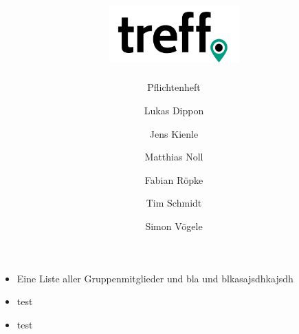 \documentclass[aspectratio=1610]{beamer}
\title{\includegraphics[width = 50mm]{images/logo_crop.png}}
\subtitle{\huge Pflichtenheft}
\author{Lukas Dippon
	\and Jens Kienle
	\and Matthias Noll
	\and Fabian Röpke
	\and Tim Schmidt
	\and Simon Vögele}
\begin{document}
	
	\begin{frame}[plain]
	\maketitle
	\end{frame}

	\begin{frame}[plain]
		\begin{minipage}{0.5\textwidth}
			\setlength{\fboxsep}{0pt}%
			\setlength{\fboxrule}{1pt}%
			\captionsetup{labelformat=empty}
			\centering
		\end{minipage}%
		\begin{minipage}{0.5\textwidth}
			\begin{itemize}
				\item Eine Liste aller Gruppenmitglieder und bla und blkasajsdhkajsdh
				\item test
				\item test
			\end{itemize}
		\end{minipage}
	
	\end{frame}
\end{document}
